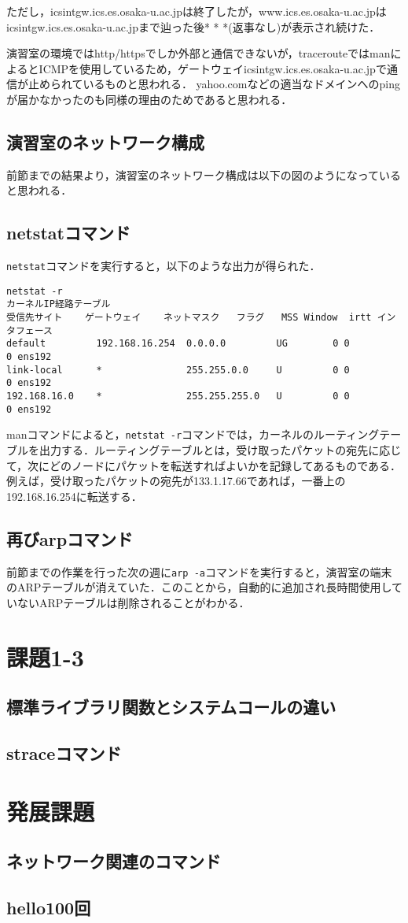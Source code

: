\documentclass[a4j,10pt,titlepage]{jsarticle}
\begin{document}
ただし，icsintgw.ics.es.osaka-u.ac.jpは終了したが，www.ics.es.osaka-u.ac.jpはicsintgw.ics.es.osaka-u.ac.jpまで辿った後* * *(返事なし)が表示され続けた．

演習室の環境ではhttp/httpsでしか外部と通信できないが，tracerouteではmanによるとICMPを使用しているため，ゲートウェイicsintgw.ics.es.osaka-u.ac.jpで通信が止められているものと思われる．
yahoo.comなどの適当なドメインへのpingが届かなかったのも同様の理由のためであると思われる．

\subsection{演習室のネットワーク構成}
前節までの結果より，演習室のネットワーク構成は以下の図のようになっていると思われる．
\subsection{netstatコマンド}
\verb|netstat|コマンドを実行すると，以下のような出力が得られた．
\begin{verbatim}
netstat -r
カーネルIP経路テーブル
受信先サイト    ゲートウェイ    ネットマスク   フラグ   MSS Window  irtt インタフェース
default         192.168.16.254  0.0.0.0         UG        0 0          0 ens192
link-local      *               255.255.0.0     U         0 0          0 ens192
192.168.16.0    *               255.255.255.0   U         0 0          0 ens192
\end{verbatim}
manコマンドによると，\verb|netstat -r|コマンドでは，カーネルのルーティングテーブルを出力する．ルーティングテーブルとは，受け取ったパケットの宛先に応じて，次にどのノードにパケットを転送すればよいかを記録してあるものである．例えば，受け取ったパケットの宛先が133.1.17.66であれば，一番上の192.168.16.254に転送する．

\subsection{再びarpコマンド}
前節までの作業を行った次の週に\verb|arp -a|コマンドを実行すると，演習室の端末のARPテーブルが消えていた．このことから，自動的に追加され長時間使用していないARPテーブルは削除されることがわかる．

\section{課題1-3}
\subsection{標準ライブラリ関数とシステムコールの違い}
\subsection{straceコマンド}
\section{発展課題}
\subsection{ネットワーク関連のコマンド}
\subsection{hello100回}
\end{document}
